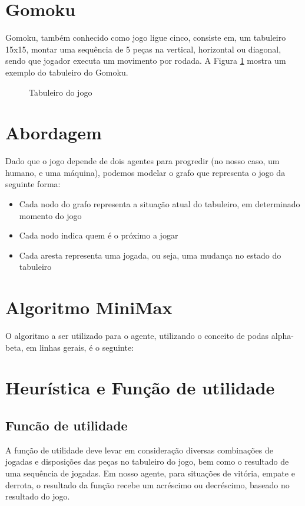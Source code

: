 \documentclass{article}
\begin{document}
  
  \section{Gomoku}
  Gomoku, também conhecido como jogo ligue cinco, consiste em, um tabuleiro 15x15, montar uma sequência de 5 peças na
  vertical, horizontal ou diagonal, sendo que jogador executa um
  movimento por rodada. A Figura \ref{fig:gomoku} mostra um exemplo do tabuleiro do Gomoku.
  
  \begin{figure}[h!]
    \centering
    \caption{Tabuleiro do jogo}
    \label{fig:gomoku}
  \end{figure}
  
  \section{Abordagem}
  Dado que o jogo depende de dois agentes para progredir (no nosso caso, um humano, e uma máquina), podemos modelar o
  grafo que representa o jogo da seguinte forma:
  
  \begin{itemize}
    \item Cada nodo do grafo representa a situação atual do tabuleiro, em determinado momento do jogo
    \item Cada nodo indica quem é o próximo a jogar
    \item Cada aresta representa uma jogada, ou seja, uma mudança no estado do tabuleiro
  \end{itemize}
  
  \section{Algoritmo MiniMax}
  O algoritmo a ser utilizado para o agente, utilizando o conceito de podas alpha-beta, em linhas gerais, é o seguinte:
  
  
  \section{Heurística e Função de utilidade}
    \subsection {Funcão de utilidade}
      A função de utilidade deve levar em consideração diversas combinações de jogadas e disposições das peças
      no tabuleiro do jogo, bem como o resultado de uma sequência de jogadas. Em nosso agente, para situações de
      vitória, empate e derrota, o resultado da função recebe um acréscimo ou decréscimo, baseado no resultado do jogo.
  
\end{document}
